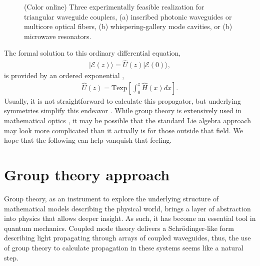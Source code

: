 \documentclass[9pt,twocolumn,twoside]{osajnl}
\begin{document}
\begin{figure}[htbp]
\centering
{}
\caption{(Color online) Three experimentally feasible realization for triangular waveguide couplers, (a) inscribed photonic waveguides or multicore optical fibers, (b) whispering-gallery mode cavities, or (b) microwave resonators.}
\label{fig:Fig1}
\end{figure}


The formal solution to this ordinary differential equation,
\begin{eqnarray}
\vert \mathcal{E}(z) \rangle = \hat{U}(z) \vert \mathcal{E}(0) \rangle,
\end{eqnarray}
is provided by an ordered exponential \cite{Magnus1954p649,Blanes2009p151}, 
\begin{eqnarray} 
\hat{U}(z) = \mathrm{Texp} \left[ \int_{0}^{z} \hat{H}(x) dx \right].
\end{eqnarray}
Usually, it is not straightforward to calculate this propagator,
but underlying symmetries simplify this endeavor \cite{Lie1880p441,Wei1963p575,Neumaier2008}.
While group theory is extensively used in mathematical optics \cite{Wolf2004,Lakshminarayanan2012}, it may be possible that the standard Lie algebra approach may look more complicated than it actually is for those outside that field. 
We hope that the following can help vanquish that feeling.


\section{Group theory approach}

Group theory, as an instrument to explore the underlying structure of mathematical models describing the physical world, brings a layer of abstraction into physics that allows deeper insight.
As such, it has become an essential tool in quantum mechanics.
Coupled mode theory delivers a Schr\"odinger-like form describing light propagating through arrays of coupled waveguides, thus, the use of group theory to calculate propagation in these systems seems like a natural step.
\end{document}
